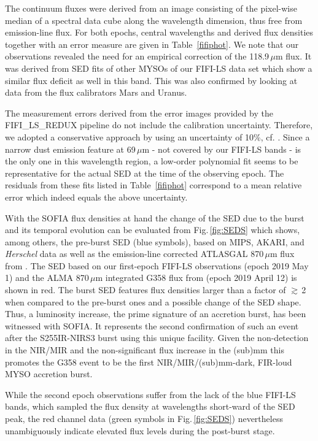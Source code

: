 The continuum fluxes were derived from an image consisting of the pixel-wise median of a spectral data cube along the wavelength dimension, thus free from emission-line flux. For both epochs, central wavelengths and derived flux densities together with an error measure are given in Table \,\ref{fifiphot}. We note that our observations revealed the need for an empirical correction of the 118.9\,$\mu$m flux. It was derived from SED fits of other MYSOs of our FIFI-LS data set which show a similar flux deficit as well in this band. This was also
confirmed by looking at data from the flux calibrators Mars and Uranus.

The measurement errors derived from the error images provided by the FIFI\_LS\_REDUX pipeline do not include the calibration uncertainty. Therefore, we adopted a conservative approach by using an uncertainty of 10\%, cf. \citet{2019AAS...23420805F}. Since a narrow dust emission feature at 69\,$\mu$m \citep{2013A&A...553A...5S} - not covered by our FIFI-LS bands - is the only one in this wavelength region, a low-order polynomial fit seems to be representative for the actual SED at the time of the observing epoch. The residuals from these fits listed in Table \,\ref{fifiphot}  correspond to a mean relative error which indeed equals the above uncertainty. 

With the SOFIA flux densities at hand the change of the SED due to the burst and its temporal evolution can be evaluated from
Fig.\,\ref{fig:SEDS} which shows, among others, the pre-burst SED (blue symbols), based on MIPS, AKARI, and
{\em Herschel}
data as well as the emission-line corrected ATLASGAL 870\,$\mu$m flux from \citet{2019ApJ...881L..39B}. The SED based on our first-epoch FIFI-LS observations (epoch 2019 May 1) and the ALMA 870\,$\mu$m integrated G358 flux from \citet{2019ApJ...881L..39B} (epoch 2019 April 12) is shown in red. The burst SED features flux densities larger than a factor of {$\gtrsim$}\,2 when compared to the pre-burst ones and a possible change of the SED shape. Thus, a luminosity increase, the prime signature of an accretion burst, has been witnessed with SOFIA. It represents the second confirmation of such an event
after the S255IR-NIRS3 burst \citep{2017NatPh..13..276C}
using this unique facility. Given the non-detection in the NIR/MIR and the non-significant flux increase in the (sub)mm \citep{2019ApJ...881L..39B} this promotes the G358 event to be the first NIR/MIR/(sub)mm-dark, FIR-loud MYSO accretion burst.

While the second epoch observations suffer from the lack of the blue FIFI-LS bands, which sampled the flux density at wavelengths short-ward of the SED peak, the red channel data (green symbols in Fig.\,\ref{fig:SEDS}) nevertheless unambiguously indicate elevated flux levels during the post-burst stage.


